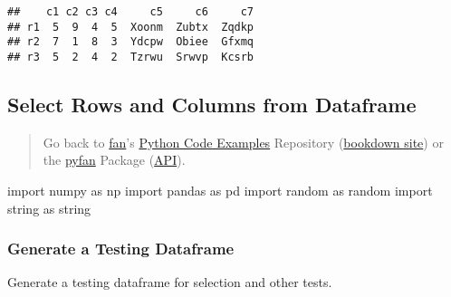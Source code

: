 \documentclass[
]{book}
\newenvironment{Shaded}{\begin{snugshade}}{\end{snugshade}}
\newcommand{\ImportTok}[1]{#1}
\newcommand{\NormalTok}[1]{#1}
\begin{document}
\begin{verbatim}
##    c1 c2 c3 c4     c5     c6     c7
## r1  5  9  4  5  Xoonm  Zubtx  Zqdkp
## r2  7  1  8  3  Ydcpw  Obiee  Gfxmq
## r3  5  2  4  2  Tzrwu  Srwvp  Kcsrb
\end{verbatim}

\hypertarget{select-rows-and-columns-from-dataframe}{%
\subsection{Select Rows and Columns from Dataframe}\label{select-rows-and-columns-from-dataframe}}

\begin{quote}
Go back to \href{http://fanwangecon.github.io/}{fan}'s \href{https://fanwangecon.github.io/Py4Econ/}{Python Code Examples} Repository (\href{https://fanwangecon.github.io/Py4Econ/bookdown}{bookdown site}) or the \href{https://pyfan.readthedocs.io/en/latest/}{pyfan} Package (\href{https://pyfan.readthedocs.io/en/latest/reference.html}{API}).
\end{quote}

\begin{Shaded}
\begin{Highlighting}[]
\ImportTok{import}\NormalTok{ numpy }\ImportTok{as}\NormalTok{ np}
\ImportTok{import}\NormalTok{ pandas }\ImportTok{as}\NormalTok{ pd}
\ImportTok{import}\NormalTok{ random }\ImportTok{as}\NormalTok{ random}
\ImportTok{import}\NormalTok{ string }\ImportTok{as}\NormalTok{ string}
\end{Highlighting}
\end{Shaded}

\hypertarget{generate-a-testing-dataframe}{%
\subsubsection{Generate a Testing Dataframe}\label{generate-a-testing-dataframe}}

Generate a testing dataframe for selection and other tests.
\end{document}
